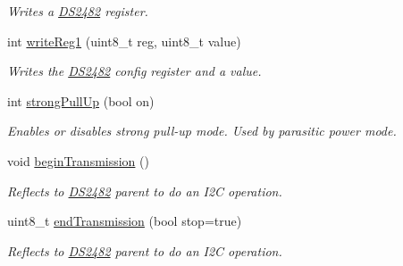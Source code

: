 \begin{DoxyCompactItemize}
\begin{DoxyCompactList}\small\item\em Writes a \mbox{\hyperlink{class_d_s2482}{D\+S2482}} register. \end{DoxyCompactList}\item 
\mbox{\label{class_d_s2482_command_a9d3be13ad42ea9757a4419a9ca37a50a}} 
int \mbox{\hyperlink{class_d_s2482_command_a9d3be13ad42ea9757a4419a9ca37a50a}{write\+Reg1}} (uint8\+\_\+t reg, uint8\+\_\+t value)
\begin{DoxyCompactList}\small\item\em Writes the \mbox{\hyperlink{class_d_s2482}{D\+S2482}} config register and a value. \end{DoxyCompactList}\item 
\mbox{\label{class_d_s2482_command_a1c3a266a0513550cfa708a3e32af90be}} 
int \mbox{\hyperlink{class_d_s2482_command_a1c3a266a0513550cfa708a3e32af90be}{strong\+Pull\+Up}} (bool on)
\begin{DoxyCompactList}\small\item\em Enables or disables strong pull-\/up mode. Used by parasitic power mode. \end{DoxyCompactList}\item 
\mbox{\label{class_d_s2482_command_a2efe9cb03d44be8cc1223f34417b0656}} 
void \mbox{\hyperlink{class_d_s2482_command_a2efe9cb03d44be8cc1223f34417b0656}{begin\+Transmission}} ()
\begin{DoxyCompactList}\small\item\em Reflects to \mbox{\hyperlink{class_d_s2482}{D\+S2482}} parent to do an I2C operation. \end{DoxyCompactList}\item 
\mbox{\label{class_d_s2482_command_ac0f1d16ab0365ba40fd928f3f94915c8}} 
uint8\+\_\+t \mbox{\hyperlink{class_d_s2482_command_ac0f1d16ab0365ba40fd928f3f94915c8}{end\+Transmission}} (bool stop=true)
\begin{DoxyCompactList}\small\item\em Reflects to \mbox{\hyperlink{class_d_s2482}{D\+S2482}} parent to do an I2C operation. \end{DoxyCompactList}\item 
\mbox{\label{class_d_s2482_command_a968712d6c1e7386f8e4c07fae845d407}} 

\end{DoxyCompactItemize}

